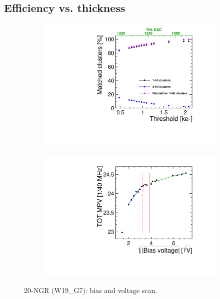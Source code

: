 \subsection{Efficiency vs. thickness}


\begin{figure}[htbp] \centering
  \begin{subfigure}[b]{0.45\textwidth}
    \includegraphics[width=\textwidth]{./figures/TestBeam/ThresholdScan_W0019_G07.pdf}
    \caption{}
  \end{subfigure} \hfill
  \begin{subfigure}[b]{0.45\textwidth}
    \includegraphics[width=\textwidth]{./figures/TestBeam/depletionVoltage_W0019_G07.pdf}
    \caption{}
  \end{subfigure}
  \caption{20-NGR (W19\_G7): bias and voltage scan.}
  \label{fig:Timepix3_THLscan_Vdep_G7}
\end{figure}


